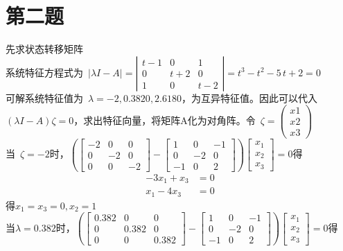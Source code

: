 \documentclass[a4paper]{article}
\begin{document}
\section*{第二题} 
先求状态转移矩阵\\
\mbox{系统特征方程式为 }$\left|{\lambda}I-A \right|=\left|\begin{array}{ccc} t - 1 & 0 & 1\\ 0 & t + 2 & 0\\ 1 & 0 & t - 2 \end{array}\right|=t^3 - t^2 - 5\, t + 2=0 $ \\
\mbox{可解系统特征值为 }$\lambda= -2,0.3820,2.6180$，为互异特征值。因此可以代入$({\lambda}I-A){\zeta}=0 $，求出特征向量，将矩阵A化为对角阵。\mbox{令 }$\zeta=\left(\begin{array}{ccc} x1 \\ x2 \\x3 \end{array}\right) $ \\
\mbox{当 }$\zeta=-2$时，$\left(\left[\begin{array}{ccc} -2 & 0 & 0 \\ 0 & -2 & 0 \\ 0 & 0 & -2 \end{array}\right]-\left[\begin{array}{ccc} 1 & 0 & -1 \\ 0 & -2 & 0 \\ -1 & 0 & 2 \end{array}\right]\right)\left[\begin{array}{ccc} x_{1} \\ x_{2}  \\ x_{3} \end{array}\right]=0$得 \\
\begin{align*}
-3x_1+x_3 &= 0 \\
x_1-4x_3 &= 0
\end{align*}
得$x_1=x_3=0,x_2=1$ \\
当$\lambda=0.382$时，$ \left(\left[\begin{array}{ccc} 0.382 & 0 & 0\\ 0 & 0.382 & 0\\ 0 & 0 & 0.382 \end{array}\right]-\left[\begin{array}{ccc} 1 & 0 & -1\\ 0 & -2 & 0\\ -1 & 0 & 2 \end{array}\right]\right)\left[\begin{array}{ccc} x_{1} \\ x_{2}  \\ x_{3} \end{array}\right]=0 $得\\
\end{document}
